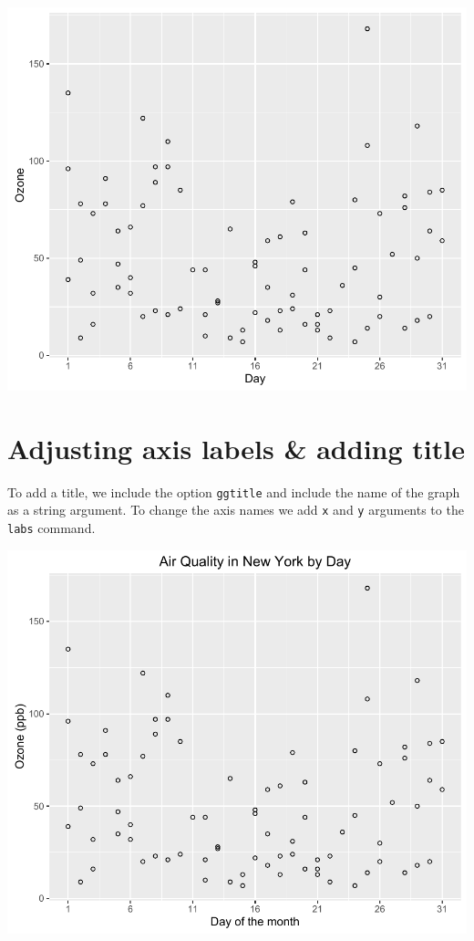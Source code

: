 \begin{center}\includegraphics[width=0.6\linewidth]{5_Scatter_Plots_pdf/scatter_3-1} \end{center}

\section{Adjusting axis labels \& adding
title}\label{adjusting-axis-labels-adding-title}

To add a title, we include the option \texttt{ggtitle} and include the
name of the graph as a string argument. To change the axis names we add
\texttt{x} and \texttt{y} arguments to the \texttt{labs} command.

\begin{Shaded}
\begin{Highlighting}[]
\StringTok{ }\StringTok{ }\NormalTok{(}\NormalTok{) +}\StringTok{ }
\StringTok{  }\NormalTok{(} \NormalTok{, } \NormalTok{) }
\end{Highlighting}
\end{Shaded}

\begin{center}\includegraphics[width=0.6\linewidth]{5_Scatter_Plots_pdf/scatter_4-1} \end{center}

